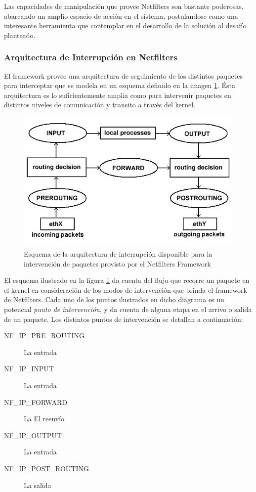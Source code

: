 Las capacidades de manipulación que provee Netfilters son bastante poderosas, abarcando un amplio espacio de acción en el sistema, postulandose como una interesante herramienta que contemplar en el desarrollo de la solución al desafío planteado.

\subsubsection{Arquitectura de Interrupción en Netfilters}
El framework provee una arquitectura de seguimiento de los distintos paquetes para interceptar que se modela en un esquema definido en la imagen \ref{netfilterArchitecture}. Ésta arquitectura es lo suficientemente amplia como para intervenir paquetes en distintos niveles de comunicación y transito a través del kernel.

\begin{figure}[!h]
	\centering
	\includegraphics[scale=.5]{imagenes/netfilterArchitecture}
	\caption{Esquema de la arquitectura de interrupción disponible para la intervención de paquetes provisto por el Netfilters Framework}
	\label{netfilterArchitecture}
\end{figure}

El esquema ilustrado en la figura \ref{netfilterArchitecture} da cuenta del flujo que recorre un paquete en el kernel en consideración de los modos de intervención que brinda el framework de Netfilters. Cada uno de los puntos ilustrados en dicho diagrama es un potencial \emph{punto de intervención}, y da cuenta de alguna etapa en el arrivo o salida de un paquete. Los distintos puntos de intervención se detallan a continuación:

\begin{description}
\item[NF\_IP\_PRE\_ROUTING] La entrada
\item[NF\_IP\_INPUT] La entrada
\item[NF\_IP\_FORWARD] La El reenvío
\item[NF\_IP\_OUTPUT] La entrada
\item[NF\_IP\_POST\_ROUTING] La salida
\end{description}

